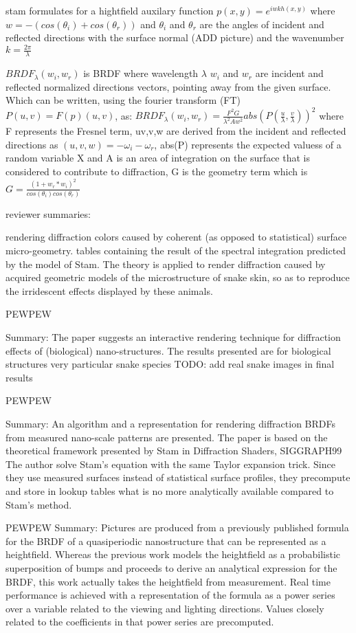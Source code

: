 stam formulates for a hightfield auxilary function $p(x,y) = e^{iwkh(x,y)}$ where $w = -(cos(\theta_i)+cos(\theta_r))$ and $\theta_i$ and $\theta_r$ are the angles of incident and reflected directions with the surface normal (ADD picture) and the wavenumber $k=\frac{2\pi}{\lambda}$

$BRDF_{\lambda}(w_i, w_r)$ is BRDF where wavelength $\lambda$ $w_i$ and $w_r$ are incident and reflected normalized directions vectors, pointing away from the given surface. Which can be written, using the fourier transform (FT) $P(u,v) = F(p)(u,v)$, as:
$BRDF_{\lambda}(w_i, w_r) = \frac{F^2 G}{\lambda^2 A w^2}abs(P(\frac{u}{\lambda},\frac{v}{\lambda}))^2$ where F represents the Fresnel term, uv,v,w are derived from the incident and reflected directions as $(u,v,w) = -\omega_i - \omega_r$, abs(P) represents the expected valuess of a random variable X and A is an area of integration on the surface that is considered to contribute to diffraction, G is the geometry term which is $G = \frac{(1+w_r * w_i)^2}{cos(\theta_i)cos(\theta_r)}$


reviewer summaries:

rendering diffraction colors caused by coherent (as opposed to statistical) surface micro-geometry.
tables containing the result of the spectral integration predicted by the model of Stam. 
The theory is applied to render diffraction caused by acquired geometric models of the microstructure of snake skin, so as to reproduce the irridescent effects displayed by these animals. 

PEWPEW

Summary: The paper suggests an interactive rendering technique for diffraction effects of (biological) nano-structures. 
The results presented are for biological structures very particular snake species
TODO: add real snake images in final results

PEWPEW

Summary: An algorithm and a representation for rendering diffraction BRDFs from measured nano-scale patterns are presented.
The paper is based on the theoretical framework presented by Stam in Diffraction Shaders, SIGGRAPH99
The author solve Stam's equation with the same Taylor expansion trick. Since they use measured surfaces instead of statistical surface profiles, they precompute and store in lookup tables what is no more analytically available compared to Stam's method.


PEWPEW
Summary: Pictures are produced from a previously published formula for the BRDF of a quasiperiodic nanostructure that can be represented as a heightfield. Whereas the previous work models the heightfield as a probabilistic superposition of bumps and proceeds to derive an analytical expression for the BRDF, this work actually takes the heightfield from measurement. Real time performance is achieved with a representation of the formula as a power series over a variable related to the viewing and lighting directions. Values closely related to the coefficients in that power series are precomputed.


